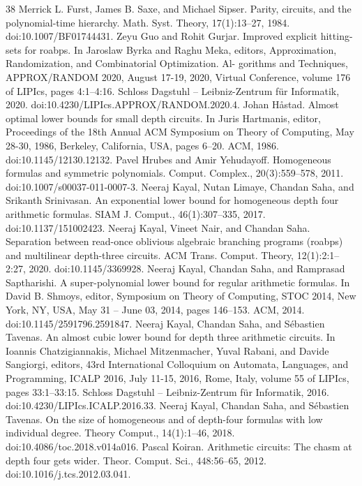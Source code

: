 \documentclass[10pt,a4paper]{article}
\begin{document}
\begin{thebibliography}{38}
 Merrick L. Furst, James B. Saxe, and Michael Sipser. Parity, circuits, and the polynomial-time hierarchy. Math. Syst. Theory, 17(1):13–27, 1984. doi:10.1007/BF01744431.
 Zeyu Guo and Rohit Gurjar. Improved explicit hitting-sets for roabps. In Jaroslaw Byrka and Raghu Meka, editors, Approximation, Randomization, and Combinatorial Optimization. Al- gorithms and Techniques, APPROX/RANDOM 2020, August 17-19, 2020, Virtual Conference, volume 176 of LIPIcs, pages 4:1–4:16. Schloss Dagstuhl – Leibniz-Zentrum für Informatik, 2020. doi:10.4230/LIPIcs.APPROX/RANDOM.2020.4.
 Johan Håstad. Almost optimal lower bounds for small depth circuits. In Juris Hartmanis, editor, Proceedings of the 18th Annual ACM Symposium on Theory of Computing, May 28-30, 1986, Berkeley, California, USA, pages 6–20. ACM, 1986. doi:10.1145/12130.12132.
 Pavel Hrubes and Amir Yehudayoff. Homogeneous formulas and symmetric polynomials. Comput. Complex., 20(3):559–578, 2011. doi:10.1007/s00037-011-0007-3.
 Neeraj Kayal, Nutan Limaye, Chandan Saha, and Srikanth Srinivasan. An exponential lower bound for homogeneous depth four arithmetic formulas. SIAM J. Comput., 46(1):307–335, 2017. doi:10.1137/151002423.
 Neeraj Kayal, Vineet Nair, and Chandan Saha. Separation between read-once oblivious algebraic branching programs (roabps) and multilinear depth-three circuits. ACM Trans. Comput. Theory, 12(1):2:1–2:27, 2020. doi:10.1145/3369928.
 Neeraj Kayal, Chandan Saha, and Ramprasad Saptharishi. A super-polynomial lower bound for regular arithmetic formulas. In David B. Shmoys, editor, Symposium on Theory of Computing, STOC 2014, New York, NY, USA, May 31 – June 03, 2014, pages 146–153. ACM, 2014. doi:10.1145/2591796.2591847.
 Neeraj Kayal, Chandan Saha, and Sébastien Tavenas. An almost cubic lower bound for depth three arithmetic circuits. In Ioannis Chatzigiannakis, Michael Mitzenmacher, Yuval Rabani, and Davide Sangiorgi, editors, 43rd International Colloquium on Automata, Languages, and Programming, ICALP 2016, July 11-15, 2016, Rome, Italy, volume 55 of LIPIcs, pages 33:1–33:15. Schloss Dagstuhl – Leibniz-Zentrum für Informatik, 2016. doi:10.4230/LIPIcs.ICALP.2016.33.
 Neeraj Kayal, Chandan Saha, and Sébastien Tavenas. On the size of homogeneous and of depth-four formulas with low individual degree. Theory Comput., 14(1):1–46, 2018. doi:10.4086/toc.2018.v014a016.
 Pascal Koiran. Arithmetic circuits: The chasm at depth four gets wider. Theor. Comput. Sci., 448:56–65, 2012. doi:10.1016/j.tcs.2012.03.041.

\end{thebibliography}
\end{document}
